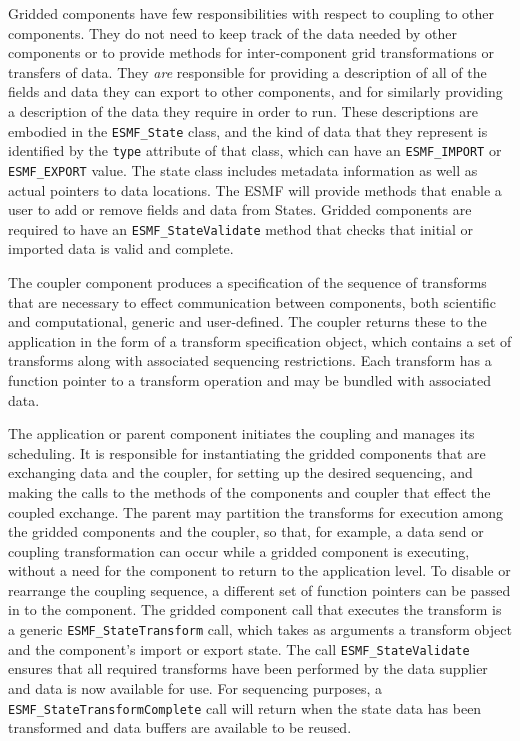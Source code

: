 Gridded components have few responsibilities with respect to coupling
to other components.  They do not need to keep track of the data needed
by other components or to provide methods for inter-component 
grid transformations or transfers of data.  They {\it are} responsible for 
providing a description of all of the fields and data they
can export to other components, and for similarly providing a description 
of the data they require in order to run.  These descriptions are
embodied in the {\tt ESMF\_State} class, and the kind of data that they 
represent is identified by the {\tt type} attribute of that class, which can
have an {\tt ESMF\_IMPORT} or {\tt ESMF\_EXPORT} value.  The state class
includes metadata information as well as actual pointers to data 
locations.  The ESMF will provide methods that enable a user to add or
remove fields and data from States.  Gridded components are required to 
have an {\tt ESMF_StateValidate} method that checks that initial or 
imported data is valid and complete.  

The coupler component produces a specification of the sequence of 
transforms that are necessary to effect communication between components, 
both scientific and computational, generic and user-defined.  The coupler 
returns these to the application in the form of a 
transform specification object, which contains a set of transforms 
along with associated sequencing restrictions.  Each transform has a
function pointer to a transform operation and may be bundled with 
associated data.

The application or parent component initiates the coupling and manages 
its scheduling.  It is responsible for instantiating the gridded components
that are exchanging data and the coupler, for setting up the desired 
sequencing, and making the calls to the methods of the components and 
coupler that effect the coupled exchange.  The parent may partition the 
transforms
for execution among the gridded components and the coupler, so that, for 
example, a data send or coupling transformation can occur while a gridded 
component is executing, without a need for the component to return to the
application level.  
To disable or rearrange the coupling sequence, a different set of function
pointers can be passed in to the component.
The gridded component call that executes the transform
is a generic {\tt ESMF\_StateTransform} call, which takes as arguments a
transform object and the component's import or export state. The
call {\tt ESMF\_StateValidate} ensures that all required transforms
have been performed by the data supplier and data is now available
for use.  For sequencing purposes, a {\tt ESMF\_StateTransformComplete} call
will return when the state data has been transformed and data
buffers are available to be reused.

